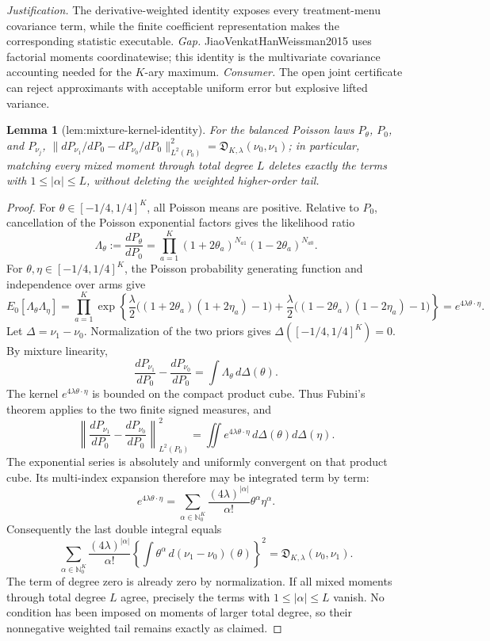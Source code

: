 \documentclass{article}
\newtheorem{lemma}{Lemma}
\begin{document}
\par\smallskip\noindent \textit{Justification.} The derivative-weighted identity exposes every treatment-menu covariance term, while the finite coefficient representation makes the corresponding statistic executable. \textit{Gap.} JiaoVenkatHanWeissman2015 uses factorial moments coordinatewise; this identity is the multivariate covariance accounting needed for the \(K\)-ary maximum. \textit{Consumer.} The open joint certificate can reject approximants with acceptable uniform error but explosive lifted variance.

\begin{lemma}[lem:mixture-kernel-identity]\label{lem:mixture-kernel-identity}
For the balanced Poisson laws \(P_\theta\), \(P_0\), and \(P_{\nu_j}\), \(\lVert dP_{\nu_1}/dP_0-dP_{\nu_0}/dP_0\rVert_{L^2(P_0)}^2=\mathfrak D_{K,\lambda}(\nu_0,\nu_1)\); in particular, matching every mixed moment through total degree \(L\) deletes exactly the terms with \(1\le\lvert\alpha\rvert\le L\), without deleting the weighted higher-order tail.
\end{lemma}
\begin{proof}
For \(\theta\in[-1/4,1/4]^K\), all Poisson means are positive.  Relative to \(P_0\), cancellation of the Poisson exponential factors gives the likelihood ratio
\[
 \Lambda_\theta:=\frac{dP_\theta}{dP_0}
 =\prod_{a=1}^K(1+2\theta_a)^{N_{a1}}(1-2\theta_a)^{N_{a0}}.
\]
For \(\theta,\eta\in[-1/4,1/4]^K\), the Poisson probability generating function and independence over arms give
\[
 E_0[\Lambda_\theta\Lambda_\eta]
 =\prod_{a=1}^K
   \exp\!\left\{\frac\lambda2\bigl((1+2\theta_a)(1+2\eta_a)-1\bigr)
                   +\frac\lambda2\bigl((1-2\theta_a)(1-2\eta_a)-1\bigr)\right\}
 =e^{4\lambda\theta\cdot\eta}.
\]
Let \(\Delta=\nu_1-\nu_0\).  Normalization of the two priors gives \(\Delta([-1/4,1/4]^K)=0\).  By mixture linearity,
\[
 \frac{dP_{\nu_1}}{dP_0}-\frac{dP_{\nu_0}}{dP_0}
 =\int \Lambda_\theta\,d\Delta(\theta).
\]
The kernel \(e^{4\lambda\theta\cdot\eta}\) is bounded on the compact product cube.  Thus Fubini's theorem applies to the two finite signed measures, and
\[
 \left\|\frac{dP_{\nu_1}}{dP_0}-\frac{dP_{\nu_0}}{dP_0}\right\|_{L^2(P_0)}^2
 =\iint e^{4\lambda\theta\cdot\eta}\,d\Delta(\theta)d\Delta(\eta).
\]
The exponential series is absolutely and uniformly convergent on that product cube.  Its multi-index expansion therefore may be integrated term by term:
\[
 e^{4\lambda\theta\cdot\eta}
 =\sum_{\alpha\in\mathbb N_0^K}
   \frac{(4\lambda)^{|\alpha|}}{\alpha!}\theta^\alpha\eta^\alpha.
\]
Consequently the last double integral equals
\[
 \sum_{\alpha\in\mathbb N_0^K}
 \frac{(4\lambda)^{|\alpha|}}{\alpha!}
 \left\{\int\theta^\alpha\,d(\nu_1-\nu_0)(\theta)\right\}^2
 =\mathfrak D_{K,\lambda}(\nu_0,\nu_1).
\]
The term of degree zero is already zero by normalization.  If all mixed moments through total degree \(L\) agree, precisely the terms with \(1\leq|\alpha|\leq L\) vanish.  No condition has been imposed on moments of larger total degree, so their nonnegative weighted tail remains exactly as claimed.
\end{proof}
\end{document}
